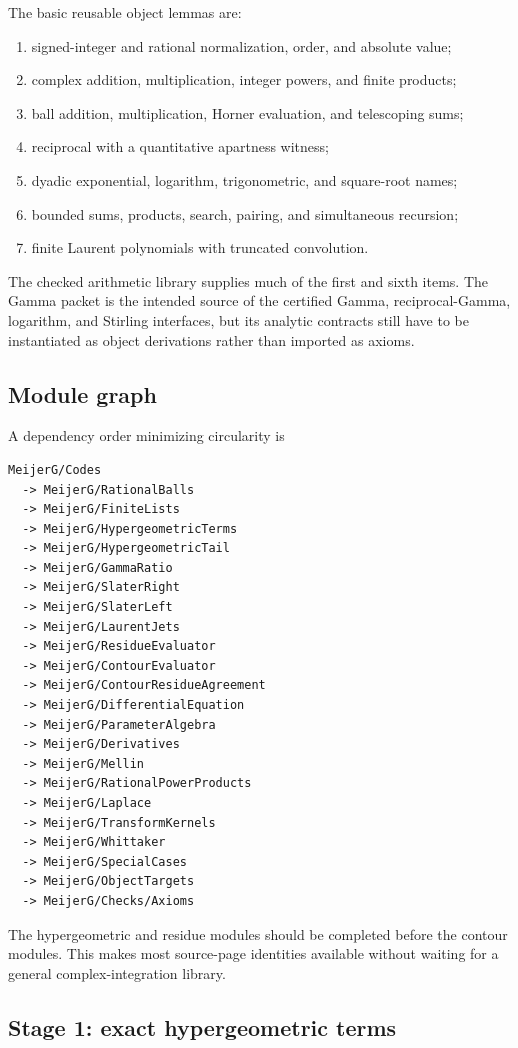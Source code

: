 The basic reusable object lemmas are:
\begin{enumerate}
\item signed-integer and rational normalization, order, and absolute value;
\item complex addition, multiplication, integer powers, and finite products;
\item ball addition, multiplication, Horner evaluation, and telescoping sums;
\item reciprocal with a quantitative apartness witness;
\item dyadic exponential, logarithm, trigonometric, and square-root names;
\item bounded sums, products, search, pairing, and simultaneous recursion;
\item finite Laurent polynomials with truncated convolution.
\end{enumerate}
The checked  arithmetic library supplies much of the
first and sixth items.  The Gamma packet is the intended source of the
certified Gamma, reciprocal-Gamma, logarithm, and Stirling interfaces, but its
analytic contracts still have to be instantiated as object derivations rather
than imported as axioms.

\subsection{Module graph}

A dependency order minimizing circularity is
\begin{verbatim}
MeijerG/Codes
  -> MeijerG/RationalBalls
  -> MeijerG/FiniteLists
  -> MeijerG/HypergeometricTerms
  -> MeijerG/HypergeometricTail
  -> MeijerG/GammaRatio
  -> MeijerG/SlaterRight
  -> MeijerG/SlaterLeft
  -> MeijerG/LaurentJets
  -> MeijerG/ResidueEvaluator
  -> MeijerG/ContourEvaluator
  -> MeijerG/ContourResidueAgreement
  -> MeijerG/DifferentialEquation
  -> MeijerG/ParameterAlgebra
  -> MeijerG/Derivatives
  -> MeijerG/Mellin
  -> MeijerG/RationalPowerProducts
  -> MeijerG/Laplace
  -> MeijerG/TransformKernels
  -> MeijerG/Whittaker
  -> MeijerG/SpecialCases
  -> MeijerG/ObjectTargets
  -> MeijerG/Checks/Axioms
\end{verbatim}
The hypergeometric and residue modules should be completed before the contour
modules.  This makes most source-page identities available without waiting for
a general complex-integration library.

\subsection{Stage 1: exact hypergeometric terms}

